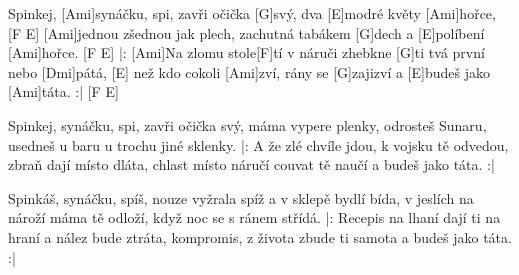 
\sloka
Spinkej, [Ami]synáčku, spi, zavři očička [G]svý,
dva [E]modré květy [Ami]hořce, [F E]
[Ami]jednou zšednou jak plech, zachutná tabákem [G]dech
a [E]políbení [Ami]hořce. [F E]
|: [Ami]Na zlomu stole[F]tí v náruči zhebkne [G]ti
tvá první nebo [Dmi]pátá, [E]
než kdo cokoli [Ami]zví, rány se [G]zajizví
a [E]budeš jako [Ami]táta. :| [F E]

\sloka
Spinkej, synáčku, spi, zavři očička svý,
máma vypere plenky,
odrosteš Sunaru, usedneš u baru
u trochu jiné sklenky.
|: A že zlé chvíle jdou, k vojsku tě odvedou,
zbraň dají místo dláta,
chlast místo náručí couvat tě naučí
a budeš jako táta. :|

\sloka
Spinkáš, synáčku, spíš, nouze vyžrala spíž
a v sklepě bydlí bída,
v jeslích na nároží máma tě odloží,
když noc se s ránem střídá.
|: Recepis na lhaní dají ti na hraní
a nález bude ztráta,
kompromis, z života zbude ti samota
a budeš jako táta. :|
